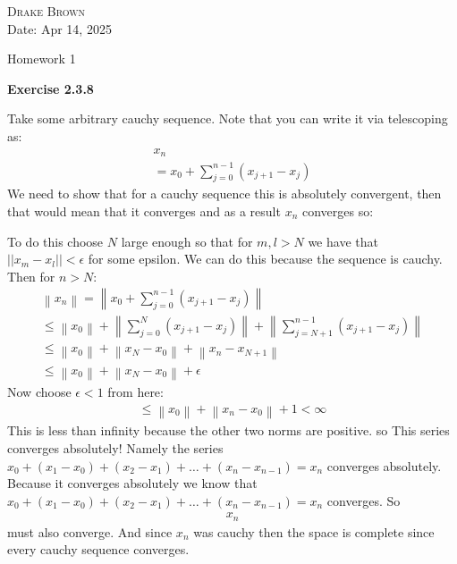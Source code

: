 \documentclass[12pt]{article}
\newcommand{\norm}[1]{\left\lVert#1\right\rVert}
\newenvironment{exercise}[1]{\vspace{.1in}\noindent\textbf{Exercise #1 \hspace{.05em}}}{}
\theoremstyle{definition}
\theoremstyle{remark}
\begin{document}
\begin{flushright}
	\textsc{Drake Brown}  \\
	Date: Apr 14, 2025
\end{flushright}
\begin{center}
	Homework 1
\end{center}

\begin{exercise}{2.3.8}

	Take some arbitrary cauchy sequence. Note that you can write it via telescoping as:
	\begin{align}
		x_n \\
		=x_0+\sum_{j=0}^{n-1}(x_{j+1}-x_j)
	\end{align}
	We need to show that for a cauchy sequence this is absolutely convergent, then that would mean that it converges and as a result $x_n$ converges so:

	To do this choose $N$ large enough so that for $m,l>N$ we have that $||x_m-x_l||<\epsilon$ for some epsilon. We can do this because the sequence is cauchy. Then for $n>N$:
	\begin{align}
		\norm{x_n}=\norm{x_0+\sum_{j=0}^{n-1}(x_{j+1}-x_j)}                                                          \\
		\leq \norm{x_0}+\norm{\sum_{j=0}^{N}(x_{j+1}-x_j)}+\norm{ \sum\limits_{j=N+1}^{n-1}\left(x_{j+1}-x_j\right)} \\
		\leq \norm{x_0}+\norm{x_N-x_0}+\norm{x_{n}-x_{N+1}}                                                          \\
		\leq  \norm{x_0}+\norm{x_N-x_0}+\epsilon
	\end{align}
	Now choose $\epsilon < 1$ from here:
	\begin{align}
		\leq \norm{x_0}+\norm{x_n-x_0}+1<\infty
	\end{align}
	This is less than infinity because the other two norms are positive. so This series converges absolutely! Namely the series $x_0+(x_1-x_0)+(x_2-x_1)+\dots + (x_n-x_{n-1})=x_n$ converges absolutely. Because it converges absolutely we know that $x_0+(x_1-x_0)+(x_2-x_1)+\dots + (x_n-x_{n-1})=x_n$ converges. So
	\begin{align}
		x_n
	\end{align}
	must also converge. And since $x_n$ was cauchy then the space is complete since every cauchy sequence converges.
\end{exercise}
\end{document}
